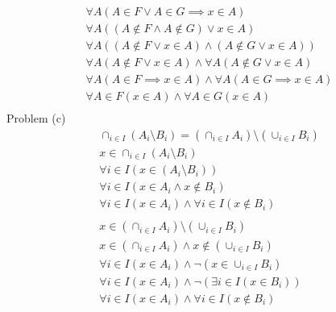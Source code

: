 \begin{questions}
\begin{align*}
  \forall A(A \in F \lor A \in G \implies x \in A)\\
  \forall A((A \notin F \land A \notin G) \lor x \in A)\\
  \forall A((A \notin F \lor x \in A) \land (A \notin G \lor x \in A))\\
  \forall A(A \notin F \lor x \in A) \land \forall A(A \notin G \lor x \in A)\\
  \forall A(A \in F \implies x \in A) \land \forall A(A \in G \implies x \in A)\\
  \forall A \in F(x \in A) \land \forall A \in G(x \in A)\\
\end{align*}
Problem (c)
\begin{align*}
  \cap_{i \in I}(A_i \setminus B_i) = (\cap_{i \in I}A_i) \setminus (\cup_{i \in I}B_i)\\
  x \in \cap_{i \in I}(A_i \setminus B_i) \\
  \forall i \in I(x \in (A_i \setminus B_i)) \\
  \forall i \in I(x \in A_i \land x \notin B_i)\\
  \forall i \in I(x \in A_i) \land \forall i \in I(x \notin B_i)\\\\
  x \in (\cap_{i \in I}A_i) \setminus (\cup_{i \in I}B_i)\\
  x \in (\cap_{i \in I}A_i) \land x \notin (\cup_{i \in I}B_i) \\
  \forall i \in I(x \in A_i) \land \neg (x \in \cup_{i \in I}B_i) \\
  \forall i \in I(x \in A_i) \land \neg (\exists i \in I(x \in B_i)) \\
  \forall i \in I(x \in A_i) \land \forall i \in I (x \notin B_i)
\end{align*}


\end{questions}
